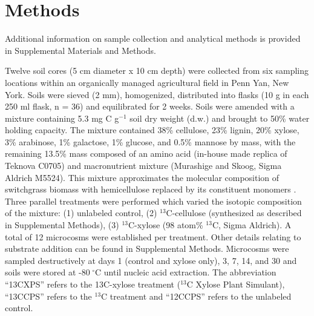 \section{Methods}
Additional information on sample collection and analytical methods is provided
in Supplemental Materials and Methods. 

Twelve soil cores (5 cm diameter x 10 cm depth) were collected from six 
sampling locations within an organically managed agricultural field in Penn
Yan, New York. Soils were sieved (2 mm), homogenized, distributed into flasks
(10 g in each 250 ml flask, n = 36) and equilibrated for 2 weeks. Soils were
amended with a mixture containing 5.3 mg C g$^{-1}$ soil dry weight (d.w.) and
brought to 50\% water holding capacity. The mixture contained 38\% cellulose,
23\% lignin, 20\% xylose, 3\% arabinose, 1\% galactose, 1\% glucose, and 0.5\%
mannose by mass, with the remaining 13.5\% mass composed of an amino acid
(in-house made replica of Teknova C0705) and macronutrient mixture (Murashige
and Skoog, Sigma Aldrich M5524).  This mixture approximates the molecular
composition of switchgrass biomass with hemicellulose replaced by its
constituent monomers \citep{Schneckenberger_2008}. Three parallel
treatments were performed which varied the isotopic composition of the mixture:
(1) unlabeled control, (2) $^{13}$C-cellulose (synthesized as described in
Supplemental Methods), (3) $^{13}$C-xylose (98 atom\% $^{13}$C, Sigma Aldrich).
A total of 12 microcosms were established per treatment. Other details relating
to substrate addition can be found in Supplemental Methods. Microcosms were
sampled destructively at days 1 (control and xylose only), 3, 7, 14, and 30 and
soils were stored at -80 $^{\circ}$C until nucleic acid extraction. The
abbreviation “13CXPS” refers to the 13C-xylose treatment ($^{13}$C Xylose Plant
Simulant), “13CCPS” refers to the $^{13}$C treatment and “12CCPS” refers to the
unlabeled control. 


